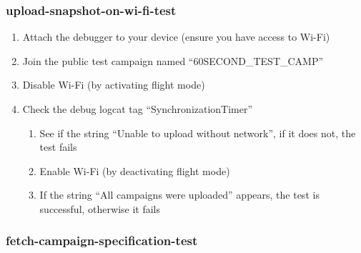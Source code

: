 \subsubsection{upload-snapshot-on-wi-fi-test}

\begin{enumerate}
    \item Attach the debugger to your device (ensure you have access to Wi-Fi)
    \item Join the public test campaign named ``60SECOND\_TEST\_CAMP''
    \item Disable Wi-Fi (by activating flight mode)
    \item Check the debug logcat tag ``SynchronizationTimer''
        \begin{enumerate}
            \item See if the string ``Unable to upload without network'', if it does not, the test fails
            \item Enable Wi-Fi (by deactivating flight mode)
            \item If the string ``All campaigns were uploaded'' appears, the test is successful, otherwise it fails
        \end{enumerate}
\end{enumerate}

\subsubsection{fetch-campaign-specification-test}

